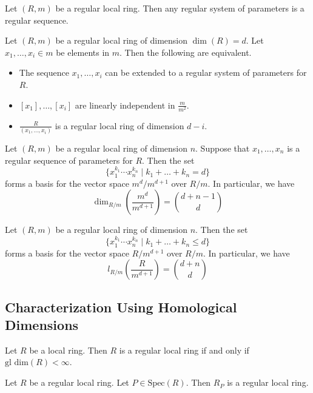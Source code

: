 \documentclass[a4paper]{article}
\begin{document}
\begin{prp}{}{} Let $(R,m)$ be a regular local ring. Then any regular system of parameters is a regular sequence. 
\end{prp}

\begin{prp}{}{} Let $(R,m)$ be a regular local ring of dimension $\dim(R)=d$. Let $x_1,\dots,x_i\in m$ be elements in $m$. Then the following are equivalent. 
\begin{itemize}
\item The sequence $x_1,\dots,x_i$ can be extended to a regular system of parameters for $R$. 
\item $[x_1],\dots,[x_i]$ are linearly independent in $\frac{m}{m^2}$. 
\item $\frac{R}{(x_1,\dots,x_i)}$ is a regular local ring of dimension $d-i$. 
\end{itemize}
\end{prp}

\begin{prp}{}{} Let $(R,m)$ be a regular local ring of dimension $n$. Suppose that $x_1,\dots,x_n$ is a regular sequence of parameters for $R$. Then the set $$\{x_1^{k_1}\cdots x_n^{k_n}\;|\;k_1+\dots+k_n=d\}$$ forms a basis for the vector space $m^d/m^{d+1}$ over $R/m$. In particular, we have $$\dim_{R/m}\left(\frac{m^d}{m^{d+1}}\right)=\binom{d+n-1}{d}$$
\end{prp}

\begin{crl}{}{} Let $(R,m)$ be a regular local ring of dimension $n$. Then the set $$\{x_1^{k_1}\cdots x_n^{k_n}\;|\;k_1+\dots+k_n\leq d\}$$ forms a basis for the vector space $R/m^{d+1}$ over $R/m$. In particular, we have $$l_{R/m}\left(\frac{R}{m^{d+1}}\right)=\binom{d+n}{d}$$
\end{crl}

\subsection{Characterization Using Homological Dimensions}
\begin{prp}{}{} Let $R$ be a local ring. Then $R$ is a regular local ring if and only if $\text{gl dim}(R)<\infty$. 
\end{prp}

\begin{crl}{}{} Let $R$ be a regular local ring. Let $P\in\text{Spec}(R)$. Then $R_P$ is a regular local ring. 
\end{crl}
\end{document}
